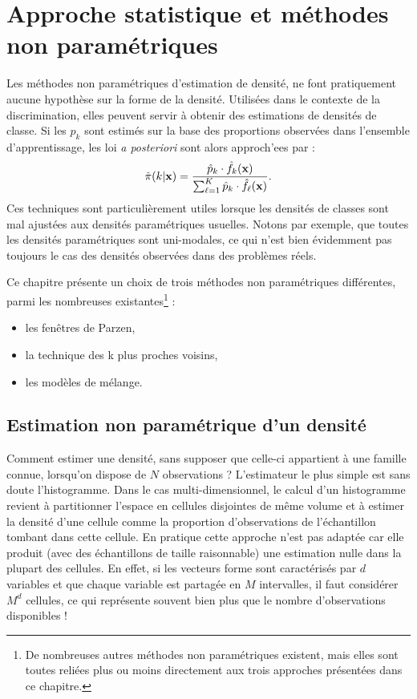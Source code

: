 \nocite{Dempster1977}
\chapter{Approche statistique et m\'ethodes non param\'etriques}

Les m\'ethodes non param\'etriques d'estimation de densit\'e,
ne font pratiquement aucune hypoth\`ese sur la forme de la 
densit\'e.
Utilis\'ees dans le contexte de la discrimination, elles 
peuvent servir \`a obtenir des estimations de densit\'es de classe.
Si les $p_k$ sont estim\'es sur la base
des proportions observ\'ees dans l'ensemble d'apprentissage, 
les loi {\em a posteriori} sont alors approch'ees par :
$$
\hat{\pi}(k| \mbox{\bf x})=\frac{\hat{p}_k \cdot \hat{f}_k(\mbox{\bf x})}{\sum_{\ell=1}^{K} \hat{p}_k \cdot \hat{f}_\ell(\mbox{\bf x})}.
$$  
Ces techniques sont particuli\`erement utiles lorsque les densit\'es
de classes sont mal ajust\'ees aux densit\'es param\'etriques usuelles. 
Notons par exemple, que toutes les densit\'es param\'etriques sont uni-modales,
ce qui n'est bien \'evidemment pas toujours le cas des densit\'es
observ\'ees dans des probl\`emes r\'eels.

Ce chapitre  pr\'esente un choix de trois m\'ethodes non param\'etriques
diff\'erentes, parmi les nombreuses existantes\footnote{De nombreuses autres m\'ethodes non 
param\'etriques existent, mais elles sont toutes reli\'ees plus ou moins directement
aux trois approches pr\'esent\'ees dans ce chapitre.} :
\begin{itemize}
\item les fen\^etres de Parzen,
\item la technique des  k plus proches voisins,
\item les mod\`eles de m\'elange.
\end{itemize}


\section{Estimation non param\'etrique d'un densit\'e}
Comment estimer une densit\'e, sans supposer que celle-ci appartient
\`a une famille connue, lorsqu'on dispose de $N$ observations ? L'estimateur
le plus simple  est sans doute l'histogramme.
Dans le cas multi-dimensionnel, le 
calcul d'un histogramme revient \`a partitionner l'espace en cellules
disjointes de m\^eme volume et \`a estimer la densit\'e d'une cellule comme la
proportion d'observations de l'\'echantillon tombant dans cette
cellule. En pratique cette approche n'est pas adapt\'ee car elle
produit (avec des \'echantillons de taille raisonnable) une
estimation nulle dans la plupart des cellules. En effet, si les vecteurs
forme sont caract\'eris\'es par $d$ variables et que chaque variable
est partag\'ee en $M$ intervalles, il faut consid\'erer $M^d$ cellules, 
ce qui repr\'esente souvent bien plus que le nombre d'observations
disponibles !   


